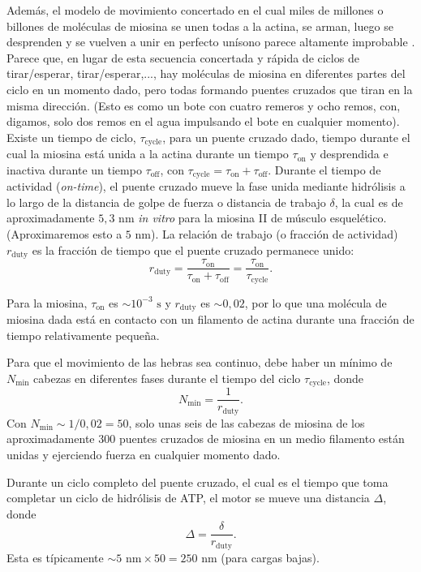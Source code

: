 \documentclass[12pt]{book}
\begin{document}
Además, el modelo de movimiento concertado en el cual miles de millones o billones de moléculas de miosina se unen todas a la actina, se arman, luego se desprenden y se vuelven a unir en perfecto unísono parece altamente improbable \cite{33, 34}. Parece que, en lugar de esta secuencia concertada y rápida de ciclos de tirar/esperar, tirar/esperar,..., hay moléculas de miosina en diferentes partes del ciclo en un momento dado, pero todas formando puentes cruzados que tiran en la misma dirección. (Esto es como un bote con cuatro remeros y ocho remos, con, digamos, solo dos remos en el agua impulsando el bote en cualquier momento). Existe un tiempo de ciclo, $\tau_{\text{cycle}}$, para un puente cruzado dado, tiempo durante el cual la miosina está unida a la actina durante un tiempo $\tau_{\text{on}}$ y desprendida e inactiva durante un tiempo $\tau_{\text{off}}$, con $\tau_{\text{cycle}} = \tau_{\text{on}} + \tau_{\text{off}}$. Durante el tiempo de actividad (\textit{on-time}), el puente cruzado mueve la fase unida mediante hidrólisis a lo largo de la distancia de golpe de fuerza o distancia de trabajo $\delta$, la cual es de aproximadamente $5{,}3\text{ nm}$ \textit{in vitro} para la miosina II de músculo esquelético. (Aproximaremos esto a $5\text{ nm}$). La relación de trabajo (o fracción de actividad) $r_{\text{duty}}$ es la fracción de tiempo que el puente cruzado permanece unido:
\begin{equation}
r_{\text{duty}} = \frac{\tau_{\text{on}}}{\tau_{\text{on}} + \tau_{\text{off}}} = \frac{\tau_{\text{on}}}{\tau_{\text{cycle}}}.
\label{eq:5.26}
\end{equation}

Para la miosina, $\tau_{\text{on}}$ es $\sim 10^{-3}\text{ s}$ y $r_{\text{duty}}$ es $\sim 0{,}02$, por lo que una molécula de miosina dada está en contacto con un filamento de actina durante una fracción de tiempo relativamente pequeña.

Para que el movimiento de las hebras sea continuo, debe haber un mínimo de $N_{\text{min}}$ cabezas en diferentes fases durante el tiempo del ciclo $\tau_{\text{cycle}}$, donde
\begin{equation}
N_{\text{min}} = \frac{1}{r_{\text{duty}}}.
\label{eq:5.27}
\end{equation}
Con $N_{\text{min}} \sim 1/0{,}02 = 50$, solo unas seis de las cabezas de miosina de los aproximadamente $300$ puentes cruzados de miosina en un medio filamento están unidas y ejerciendo fuerza en cualquier momento dado.

Durante un ciclo completo del puente cruzado, el cual es el tiempo que toma completar un ciclo de hidrólisis de ATP, el motor se mueve una distancia $\Delta$, donde
\begin{equation}
\Delta = \frac{\delta}{r_{\text{duty}}}.
\label{eq:5.28}
\end{equation}
Esta es típicamente $\sim 5\text{ nm} \times 50 = 250\text{ nm}$ (para cargas bajas).
\end{document}
